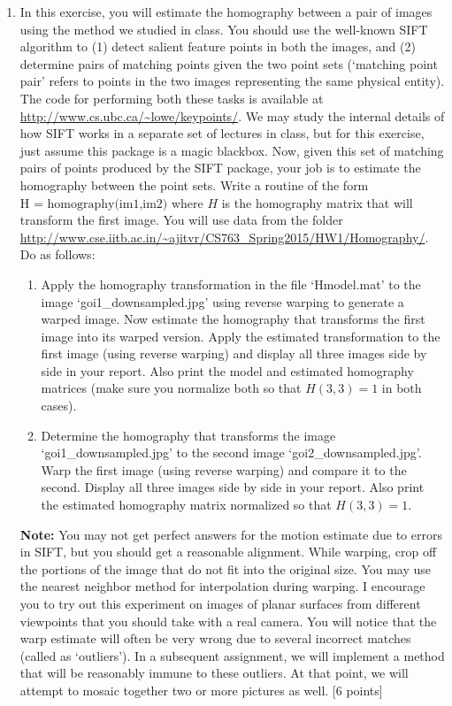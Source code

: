 \documentclass[11pt]{article}
\begin{document}
\begin{enumerate}
\item In this exercise, you will estimate the homography between a pair of images using the method we studied in class. You should use the well-known SIFT algorithm to (1) detect salient feature points in both the images, and (2) determine pairs of matching points given the two point sets (`matching point pair' refers to points in the two images representing the same physical entity). The code for performing both these tasks is available at \url{http://www.cs.ubc.ca/~lowe/keypoints/}. We may study the internal details of how SIFT works in a separate set of lectures in class, but for this exercise, just assume this package is a magic blackbox. Now, given this set of matching pairs of points produced by the SIFT package, your job is to estimate the homography between the point sets. Write a routine of the form $\textrm{H = homography(im1,im2)}$ where $H$ is the homography matrix that will transform the first image. You will use data from the folder \url{http://www.cse.iitb.ac.in/~ajitvr/CS763_Spring2015/HW1/Homography/}. Do as follows:
\begin{enumerate}
\item Apply the homography transformation in the file `Hmodel.mat' to the image `goi1\_downsampled.jpg' using reverse warping to generate a warped image. Now estimate the homography that transforms the first image into its warped version. Apply the estimated transformation to the first image (using reverse warping) and display all three images side by side in your report. Also print the model and estimated homography matrices (make sure you normalize both so that $H(3,3) = 1$ in both cases). 
\item Determine the homography that transforms the image `goi1\_downsampled.jpg' to the second image  `goi2\_downsampled.jpg'. Warp the first image (using reverse warping) and compare it to the second. Display all three images side by side in your report. Also print the estimated homography matrix normalized so that $H(3,3) = 1$. 
\end{enumerate}
\textbf{Note:} You may not get perfect answers for the motion estimate due to errors in SIFT, but you should get a reasonable alignment. While warping, crop off the portions of the image that do not fit into the original size. You may use the nearest neighbor method for interpolation during warping. I encourage you to try out this experiment on images of planar surfaces from different viewpoints that you should take with a real camera. You will notice that the warp estimate will often be very wrong due to several incorrect matches (called as `outliers'). In a subsequent assignment, we will implement a method that will be reasonably immune to these outliers. At that point, we will attempt to mosaic together two or more pictures as well. \textsf{[6 points]}
\end{enumerate}
\end{document}
